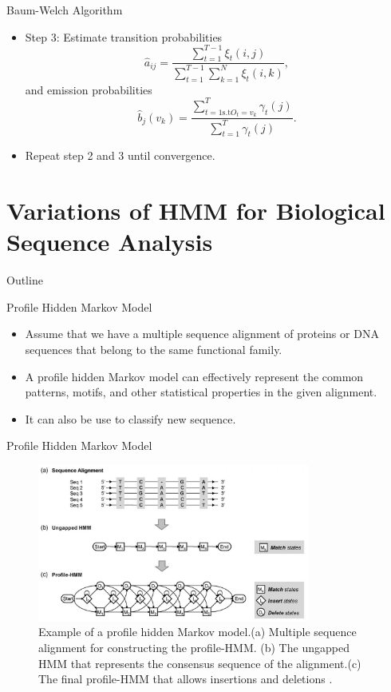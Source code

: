 \documentclass{beamer}
\begin{document}
\begin{frame}{Baum-Welch Algorithm}
	\begin{itemize}
		\item Step 3: Estimate transition probabilities
		\begin{equation}
			\hat{a}_{ij} = \frac{\sum_{t=1}^{T-1}\xi_t(i,j)}{\sum_{t=1}^{T-1}\sum_{k=1}^{N}\xi_t(i,k)},
		\end{equation}
		and emission probabilities
		\begin{equation}
			\hat{b}_j(v_k) = \frac{\sum_{t=1 \text{s.t} O_t = v_k}^T \gamma_t(j)}{\sum_{t=1}^{T}\gamma_t(j)}.
		\end{equation}
		\item Repeat step 2 and 3 until convergence.
	\end{itemize}
\end{frame}

\section{Variations of HMM for Biological Sequence Analysis}

\begin{frame}{Outline}
	\tableofcontents[currentsection]
\end{frame}

\begin{frame}{Profile Hidden Markov Model}
	\begin{itemize}
		\item Assume that we have a multiple sequence alignment of proteins or DNA sequences that belong to the same functional family. 
		\item A profile hidden Markov model can effectively represent the common patterns, motifs, and other statistical properties in the given alignment.
		\item It can also be use to classify new sequence.
	\end{itemize}
\end{frame}

\begin{frame}{Profile Hidden Markov Model}
	\begin{figure}
	\centering
	\includegraphics[width = 0.8\textwidth]{profile.png}
	\caption{ Example of a profile hidden Markov model.(a) Multiple sequence alignment for constructing the profile-HMM. (b) The ungapped HMM that represents the consensus sequence of the alignment.(c) The final profile-HMM that allows insertions and deletions \cite{yoon2009hidden}.}
	\end{figure}
\end{frame}
\end{document}
